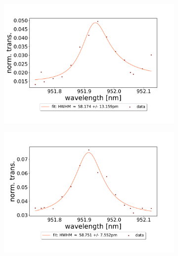 \begin{figure}[h!]
\begin{subfigure}[b]{0.49\textwidth}
        \includegraphics[width=\textwidth]{figures/results/double fano fits/20250326/83um_M3:M5_fit_5.pdf}
        \caption{}
        \label{fig:83um_M3:M5_fit_5}
    \end{subfigure}
    \begin{subfigure}[b]{0.49\textwidth}
        \includegraphics[width=\textwidth]{figures/results/double fano fits/20250326/83um_M3:M5_fit_6.pdf}
        \caption{}
        \label{fig:83um_M3:M5_fit_6}
    \end{subfigure}
\end{figure}
